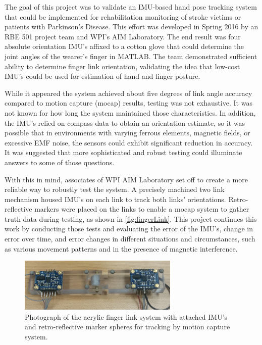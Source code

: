 \documentclass[letterpaper, 10 pt, conference]{ieeeconf}  %
\begin{document}
The goal of this project was to validate an IMU-based hand pose tracking system that could be implemented for rehabilitation monitoring of stroke victims or patients with Parkinson’s Disease. This effort was developed in Spring 2016 by an RBE 501 project team and WPI's AIM Laboratory. The end result was four absolute orientation IMU's affixed to a cotton glove that could determine the joint angles of the wearer's finger in MATLAB. The team demonstrated sufficient ability to determine finger link orientation, validating the idea that low-cost IMU's could be used for estimation of hand and finger posture.

While it appeared the system achieved about five degrees of link angle accuracy compared to motion capture (mocap) results, testing was not exhaustive. It was not known for how long the system maintained those characteristics. In addition, the IMU's relied on compass data to obtain an orientation estimate, so it was possible that in environments with varying ferrous elements, magnetic fields, or excessive EMF noise, the sensors could exhibit significant reduction in accuracy. It was suggested that more sophisticated and robust testing could illuminate answers to some of those questions.

With this in mind, associates of WPI AIM Laboratory set off to create a more reliable way to robustly test the system. A precisely machined two link mechanism housed IMU’s on each link to track both links' orientations. Retro-reflective markers were placed on the links to enable a mocap system to gather truth data during testing, as shown in \autoref{fig:fingerLink}. This project continues this work by conducting those tests and evaluating the error of the IMU's, change in error over time, and error changes in different situations and circumstances, such as various movement patterns and in the presence of magnetic interference.

\begin{figure}[thpb]
	\centering
	\includegraphics[width = 3in]{finger_link.jpg}
    \caption{Photograph of the acrylic finger link system with attached IMU's and retro-reflective marker spheres for tracking by motion capture system. }
    \label{fig:fingerLink}
\end{figure}
\end{document}
